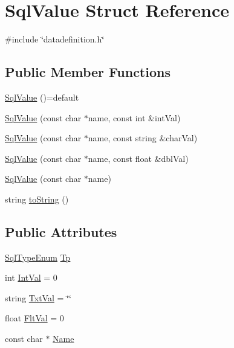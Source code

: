 \hypertarget{structSqlValue}{}\section{Sql\+Value Struct Reference}
\label{structSqlValue}


{\ttfamily \#include \char`\"{}datadefinition.\+h\char`\"{}}

\subsection*{Public Member Functions}
\begin{DoxyCompactItemize}
\item 
\mbox{\hyperlink{structSqlValue_a35ecbd8591181b12dbbc954046a6380a}{Sql\+Value}} ()=default
\item 
\mbox{\hyperlink{structSqlValue_ad1e1270b387de26ffdabb4a702304446}{Sql\+Value}} (const char $\ast$name, const int \&int\+Val)
\item 
\mbox{\hyperlink{structSqlValue_a434e7637b0a06e43c2d1b84556470f53}{Sql\+Value}} (const char $\ast$name, const string \&char\+Val)
\item 
\mbox{\hyperlink{structSqlValue_aaa5d565de799694e1f1ed216251b3eee}{Sql\+Value}} (const char $\ast$name, const float \&dbl\+Val)
\item 
\mbox{\hyperlink{structSqlValue_ad93f72e6c40c913a16dfa39573912f2b}{Sql\+Value}} (const char $\ast$name)
\item 
string \mbox{\hyperlink{structSqlValue_a0daacca986ce795c69c8022651fe5873}{to\+String}} ()
\end{DoxyCompactItemize}
\subsection*{Public Attributes}
\begin{DoxyCompactItemize}
\item 
\mbox{\hyperlink{datadefinition_8h_ad06ef517a8bb3398f146f81f18988b9f}{Sql\+Type\+Enum}} \mbox{\hyperlink{structSqlValue_a59eef92117d6b8685a8970cad60c340e}{Tp}}
\item 
int \mbox{\hyperlink{structSqlValue_a237610d8d49573b3351c494c87cb0f7f}{Int\+Val}} = 0
\item 
string \mbox{\hyperlink{structSqlValue_ad867a5a62a7935a8106945672a1928c9}{Txt\+Val}} = \char`\"{}\char`\"{}
\item 
float \mbox{\hyperlink{structSqlValue_a542ff56bf66bba588e89f72de93eaf5a}{Flt\+Val}} = 0
\item 
const char $\ast$ \mbox{\hyperlink{structSqlValue_a160fa9b84cdf9bf9dc452392570d6a11}{Name}}
\end{DoxyCompactItemize}


